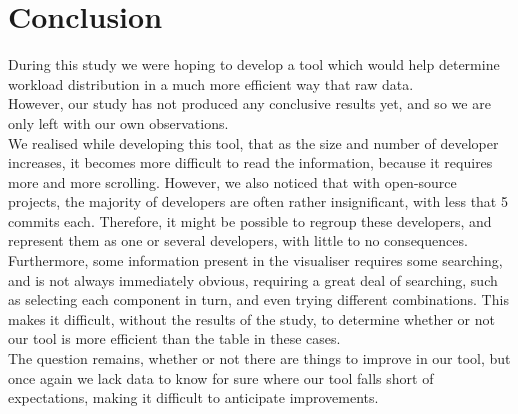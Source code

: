 \section{Conclusion}
	During this study we were hoping to develop a tool which would help determine workload distribution in a much more efficient way that raw data.\\
	However, our study has not produced any conclusive results yet, and so we are only left with our own observations.\\
	We realised while developing this tool, that as the size and number of developer increases, it becomes more difficult to read the information, because it requires more and more scrolling. However, we also noticed that with open-source projects, the majority of developers are often rather insignificant, with less that 5 commits each. Therefore, it might be possible to regroup these developers, and represent them as one or several developers, with little to no consequences.\\

	Furthermore, some information present in the visualiser requires some searching, and is not always immediately obvious, requiring a great deal of searching, such as selecting each component in turn, and even trying different combinations. This makes it difficult, without the results of the study, to determine whether or not our tool is more efficient than the table in these cases.\\

	The question remains, whether or not there are things to improve in our tool, but once again we lack data to know for sure where our tool falls short of expectations, making it difficult to anticipate improvements.